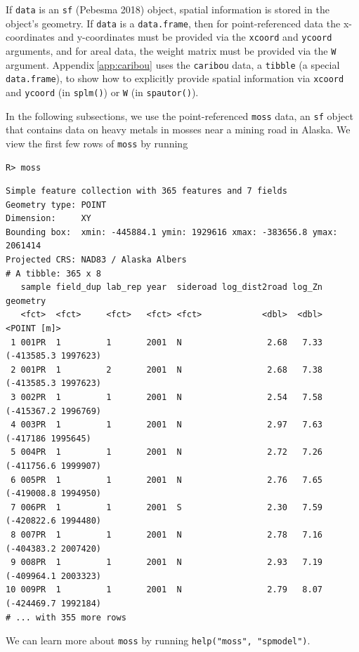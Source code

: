 \documentclass{article}
\begin{document}
If \texttt{data} is an \texttt{sf} (Pebesma 2018) object, spatial
information is stored in the object's geometry. If \texttt{data} is a
\texttt{data.frame}, then for point-referenced data the x-coordinates
and y-coordinates must be provided via the \texttt{xcoord} and
\texttt{ycoord} arguments, and for areal data, the weight matrix must be
provided via the \texttt{W} argument. Appendix\(~\)\ref{app:caribou}
uses the \texttt{caribou} data, a \texttt{tibble} (a special
\texttt{data.frame}), to show how to explicitly provide spatial
information via \texttt{xcoord} and \texttt{ycoord} (in \texttt{splm()})
or \texttt{W} (in \texttt{spautor()}).

In the following subsections, we use the point-referenced \texttt{moss}
data, an \texttt{sf} object that contains data on heavy metals in mosses
near a mining road in Alaska. We view the first few rows of
\texttt{moss} by running

\begin{verbatim}
R> moss
\end{verbatim}

\begin{verbatim}
Simple feature collection with 365 features and 7 fields
Geometry type: POINT
Dimension:     XY
Bounding box:  xmin: -445884.1 ymin: 1929616 xmax: -383656.8 ymax: 2061414
Projected CRS: NAD83 / Alaska Albers
# A tibble: 365 x 8
   sample field_dup lab_rep year  sideroad log_dist2road log_Zn            geometry
   <fct>  <fct>     <fct>   <fct> <fct>            <dbl>  <dbl>         <POINT [m]>
 1 001PR  1         1       2001  N                 2.68   7.33 (-413585.3 1997623)
 2 001PR  1         2       2001  N                 2.68   7.38 (-413585.3 1997623)
 3 002PR  1         1       2001  N                 2.54   7.58 (-415367.2 1996769)
 4 003PR  1         1       2001  N                 2.97   7.63   (-417186 1995645)
 5 004PR  1         1       2001  N                 2.72   7.26 (-411756.6 1999907)
 6 005PR  1         1       2001  N                 2.76   7.65 (-419008.8 1994950)
 7 006PR  1         1       2001  S                 2.30   7.59 (-420822.6 1994480)
 8 007PR  1         1       2001  N                 2.78   7.16 (-404383.2 2007420)
 9 008PR  1         1       2001  N                 2.93   7.19 (-409964.1 2003323)
10 009PR  1         1       2001  N                 2.79   8.07 (-424469.7 1992184)
# ... with 355 more rows
\end{verbatim}

We can learn more about \texttt{moss} by running
\texttt{help("moss",\ "spmodel")}.
\end{document}
